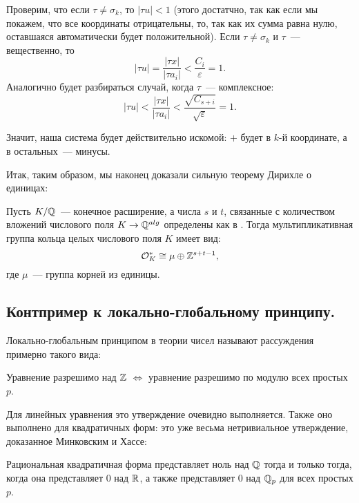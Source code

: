 	  Проверим, что если $\tau  \neq \sigma_k$, то $|\tau u| < 1$ (этого достатчно, так как если мы покажем, что все координаты отрицательны, то, так как их сумма равна нулю, оставшаяся автоматически будет положительной). Если  $\tau \neq \sigma_k$ и $\tau$~--- вещественно, то 
	  \[
	  	|\tau u| = \frac{|\tau x|}{|\tau a_i|} < \frac{C_i}{\varepsilon} = 1.
	  \]
	  Аналогично будет разбираться случай, когда $\tau$~--- комплексное: 
	  \[
	  	|\tau u| < \frac{|\tau x|}{|\tau a_i|} < \frac{\sqrt{C_{s + i}}}{\sqrt{\varepsilon}} = 1.
	  \]

	  Значит, наша система будет действительно искомой: $+$ будет в $k$-й координате, а в остальных~--- минусы. 

	  Итак, таким образом, мы наконец доказали сильную теорему Дирихле о единицах: 

	  \begin{theorem}
	  Пусть $K/\mathbb{Q}$~--- конечное расширение, а числа $s$ и $t$, связанные с количеством вложений числового поля $K \to \mathbb{Q}^{alg}$ определены как в \hyperlink{real_and_complex_inclusions}{}. Тогда мультипликативная группа кольца целых числового поля $K$ имеет вид: 
	  	\[ \mathcal{O}_{K}^{*} \cong \mu \oplus \mathbb{Z}^{s + t - 1}, \]
	  	где $\mu$~--- группа корней из единицы.
	  \end{theorem}

	  \subsection{Контпример к локально-глобальному принципу.}

	  Локально-глобальным принципом в теории чисел называют рассуждения примерно такого вида: 

	  \begin{center}
	  	Уравнение разрешимо над $\mathbb{Z}$ $\Leftrightarrow$ уравнение разрешимо по модулю всех простых $p$. 
	  \end{center}

	  Для линейных уравнения это утверждение очевидно выполняется. Также оно выполнено для квадратичных форм: это уже весьма нетривиальное утверждение, доказанное Минковским и Хассе: 

	  \begin{theorem}
	  		Рациональная квадратичная форма представляет ноль над $\mathbb{Q}$ тогда и только тогда, когда она представляет 0 над $\mathbb{R}$, а также представляет 0 над $\mathbb{Q}_{p}$ для всех простых $p$.
	  	\end{theorem}

